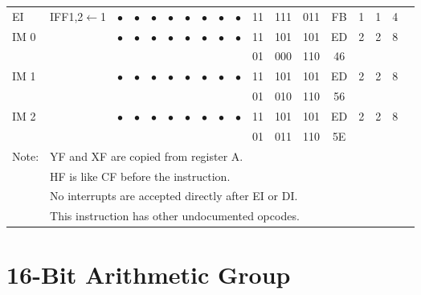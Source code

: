 \documentclass[oneside,a4paper]{book}
\begin{document}
{\begin{tabular}{llcccccccccccccccl}
		EI\footnotemark[3] & IFF1,2$\leftarrow$1 & 
			$\bullet$ & $\bullet$ & $\bullet$ & $\bullet$ & $\bullet$ & $\bullet$ & $\bullet$ & $\bullet$ &
			11 & 111 & 011 & 
			FB & 1 & 
			1 & 4 & \\[4pt]

		IM 0\footnotemark[4] & & 
			$\bullet$ & $\bullet$ & $\bullet$ & $\bullet$ & $\bullet$ & $\bullet$ & $\bullet$ & $\bullet$ &
			11 & 101 & 101 & 
			ED & 2 & 
			2 & 8 & \\
		\multicolumn{10}{c}{} & 01 & 000 & 110 & 46 & \\[4pt]

		IM 1\footnotemark[4] & & 
			$\bullet$ & $\bullet$ & $\bullet$ & $\bullet$ & $\bullet$ & $\bullet$ & $\bullet$ & $\bullet$ &
			11 & 101 & 101 & 
			ED & 2 & 
			2 & 8 & \\
		\multicolumn{10}{c}{} & 01 & 010 & 110 & 56 & \\[4pt]

		IM 2\footnotemark[4] & & 
			$\bullet$ & $\bullet$ & $\bullet$ & $\bullet$ & $\bullet$ & $\bullet$ & $\bullet$ & $\bullet$ &
			11 & 101 & 101 & 
			ED & 2 & 
			2 & 8 & \\
		\multicolumn{10}{c}{} & 01 & 011 & 110 & 5E & \\[4pt]
		
		\hline

		Note: & \multicolumn{17}{l}{\parbox{12cm}{\footnotemark[1]YF and XF are copied from register A.}} \\
			& \multicolumn{17}{l}{\parbox{12cm}{\footnotemark[2]HF is like CF before the instruction.}} \\
			& \multicolumn{17}{l}{\parbox{12cm}{\footnotemark[3]No interrupts are accepted directly after EI or DI.}} \\
			& \multicolumn{17}{l}{\parbox{12cm}{\footnotemark[4]This instruction has other undocumented opcodes.}} \\ 
	  
	\hline

	\end{tabular}
}

\section{16-Bit Arithmetic Group}
\end{document}
